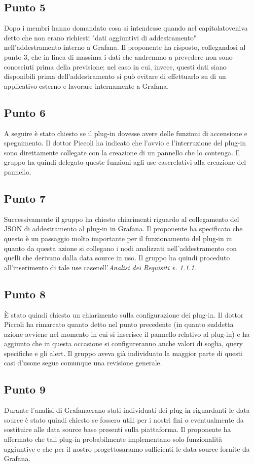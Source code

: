     \subsection{Punto 5}
        Dopo i membri hanno domandato cosa si intendesse quando nel capitolato\glosp veniva detto che non erano richiesti "dati aggiuntivi di addestramento" nell'addestramento interno a Grafana\glo. Il proponente ha risposto, collegandosi al punto 3, che in linea di massima i dati che andremmo a prevedere non sono conosciuti prima della previsione; nel caso in cui, invece, questi dati siano disponibili prima dell'addestramento si può evitare di effettuarlo su di un applicativo esterno e lavorare internamente a Grafana\glo.
    \subsection{Punto 6}
        A seguire è stato chiesto se il plug-in dovesse avere delle funzioni di accensione e spegnimento. Il dottor Piccoli ha indicato che l'avvio e l'interruzione del plug-in sono direttamente collegate con la creazione di un pannello che lo contenga. Il gruppo ha quindi delegato queste funzioni agli use case\glosp relativi alla creazione del pannello.
    \subsection{Punto 7}
        Successivamente il gruppo ha chiesto chiarimenti riguardo al collegamento del JSON di addestramento al plug-in in Grafana\glo. Il proponente ha specificato che questo è un passaggio molto importante per il funzionamento del plug-in in quanto da questa azione si collegano i nodi analizzati nell'addestramento con quelli che derivano dalla data source in uso. Il gruppo ha quindi proceduto all'inserimento di tale use case\glosp nell'\textit{Analisi dei Requisiti v. 1.1.1}.
    \subsection{Punto 8}
        È stato quindi chiesto un chiarimento sulla configurazione dei plug-in. Il dottor Piccoli ha rimarcato quanto detto nel punto precedente (in quanto suddetta azione avviene nel momento in cui si inserisce il pannello relativo al plug-in) e ha aggiunto che in questa occasione si configureranno anche valori di soglia, query specifiche e gli alert\glo. Il gruppo aveva già individuato la maggior parte di questi casi d'uso\glosp ne segue comunque una revisione generale.
    \subsection{Punto 9}
        Durante l'analisi di Grafana\glosp erano stati individuati dei plug-in riguardanti le data source è stato quindi chiesto se fossero utili per i nostri fini o eventualmente da sostituire alle data source base presenti sulla piattaforma. Il proponente ha affermato che tali plug-in probabilmente implementano solo funzionalità aggiuntive e che per il nostro progetto\glosp saranno sufficienti le data source fornite da Grafana\glo.
